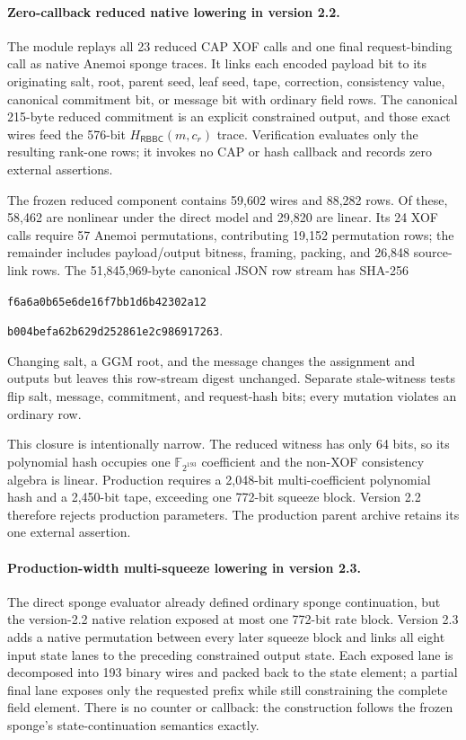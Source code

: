 \documentclass[11pt]{article}
\newcommand{\RBBC}{\mathsf{RBBC}}
\begin{document}
\paragraph{Zero-callback reduced native lowering in version 2.2.}
The module  replays all 23 reduced CAP XOF
calls and one final request-binding call as native Anemoi sponge traces.  It
links each encoded payload bit to its originating salt, root, parent seed, leaf
seed, tape, correction, consistency value, canonical commitment bit, or message
bit with ordinary field rows.  The canonical 215-byte reduced commitment is an
explicit constrained output, and those exact wires feed the 576-bit
$H_{\RBBC}(m,c_r)$ trace.  Verification evaluates only the resulting rank-one
rows; it invokes no CAP or hash callback and records zero external assertions.

The frozen reduced component contains 59,602 wires and 88,282 rows.  Of these,
58,462 are nonlinear under the direct model and 29,820 are linear.  Its 24 XOF
calls require 57 Anemoi permutations, contributing 19,152 permutation rows;
the remainder includes payload/output bitness, framing, packing, and 26,848
source-link rows.  The 51,845,969-byte canonical JSON row stream has SHA-256
\begin{center}
\texttt{f6a6a0b65e6de16f7bb1d6b42302a12}\par\vspace{-0.2em}
\texttt{b004befa62b629d252861e2c986917263}.
\end{center}
Changing salt, a GGM root, and the message changes the assignment and outputs
but leaves this row-stream digest unchanged.  Separate stale-witness tests flip
salt, message, commitment, and request-hash bits; every mutation violates an
ordinary row.

This closure is intentionally narrow.  The reduced witness has only 64 bits,
so its polynomial hash occupies one $\mathbb F_{2^{193}}$ coefficient and the
non-XOF consistency algebra is linear.  Production requires a 2,048-bit
multi-coefficient polynomial hash and a 2,450-bit tape, exceeding one 772-bit
squeeze block.  Version 2.2 therefore rejects production parameters.  The
production parent archive retains its one external assertion.

\paragraph{Production-width multi-squeeze lowering in version 2.3.}
The direct sponge evaluator already defined ordinary sponge continuation, but
the version-2.2 native relation exposed at most one 772-bit rate block.  Version
2.3 adds a native permutation between every later squeeze block and links all
eight input state lanes to the preceding constrained output state.  Each
exposed lane is decomposed into 193 binary wires and packed back to the state
element; a partial final lane exposes only the requested prefix while still
constraining the complete field element.  There is no counter or callback: the
construction follows the frozen sponge's state-continuation semantics exactly.
\end{document}
